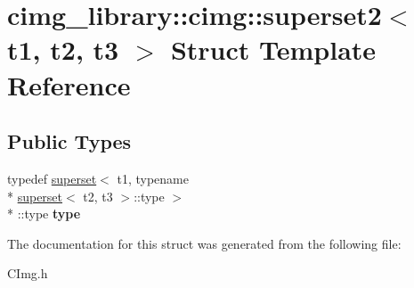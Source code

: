 \hypertarget{structcimg__library_1_1cimg_1_1superset2}{\section{cimg\-\_\-library\-:\-:cimg\-:\-:superset2$<$ t1, t2, t3 $>$ Struct Template Reference}
\label{structcimg__library_1_1cimg_1_1superset2}
}
\subsection*{Public Types}
\begin{DoxyCompactItemize}
\item 
\hypertarget{structcimg__library_1_1cimg_1_1superset2_ac6fb57401f6e39f2601afbeabadc651f}{typedef \hyperlink{structcimg__library_1_1cimg_1_1superset}{superset}$<$ t1, typename \\*
\hyperlink{structcimg__library_1_1cimg_1_1superset}{superset}$<$ t2, t3 $>$\-::type $>$\\*
\-::type {\bfseries type}}\label{structcimg__library_1_1cimg_1_1superset2_ac6fb57401f6e39f2601afbeabadc651f}

\end{DoxyCompactItemize}


The documentation for this struct was generated from the following file\-:\begin{DoxyCompactItemize}
\item 
C\-Img.\-h\end{DoxyCompactItemize}
